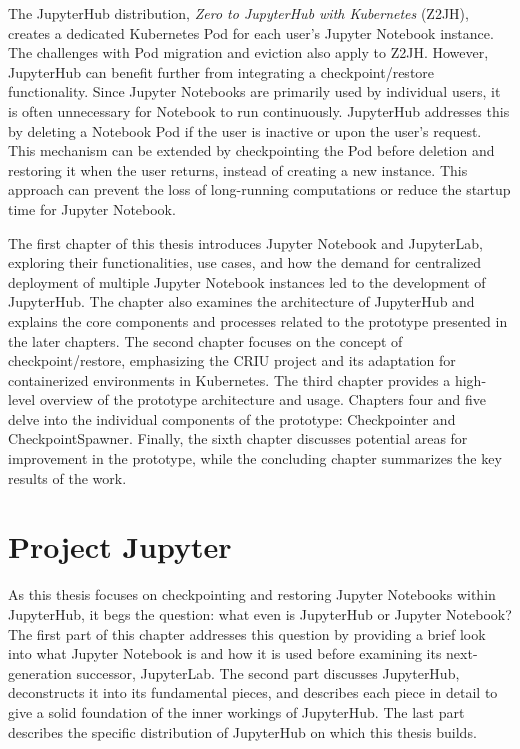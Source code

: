 \documentclass[
  digital,     %
  oneside,     %
  nosansbold,  %
  nocolorbold, %
  lof,         %
  nolot,         %
]{fithesis4}
\begin{document}
The JupyterHub distribution, \emph{Zero to JupyterHub with Kubernetes} (Z2JH), creates a dedicated Kubernetes Pod for each user's Jupyter Notebook instance. The challenges with Pod migration and eviction also apply to Z2JH. However, JupyterHub can benefit further from integrating a checkpoint/restore functionality. Since Jupyter Notebooks are primarily used by individual users, it is often unnecessary for Notebook to run continuously. JupyterHub addresses this by deleting a Notebook Pod if the user is inactive or upon the user's request. This mechanism can be extended by checkpointing the Pod before deletion and restoring it when the user returns, instead of creating a new instance. This approach can prevent the loss of long-running computations or reduce the startup time for Jupyter Notebook.

The first chapter of this thesis introduces Jupyter Notebook and JupyterLab, exploring their functionalities, use cases, and how the demand for centralized deployment of multiple Jupyter Notebook instances led to the development of JupyterHub. The chapter also examines the architecture of JupyterHub and explains the core components and processes related to the prototype presented in the later chapters. The second chapter focuses on the concept of checkpoint/restore, emphasizing the CRIU project and its adaptation for containerized environments in Kubernetes. The third chapter provides a high-level overview of the prototype architecture and usage. Chapters four and five delve into the individual components of the prototype: Checkpointer and CheckpointSpawner. Finally, the sixth chapter discusses potential areas for improvement in the prototype, while the concluding chapter summarizes the key results of the work.

\chapter{Project Jupyter}
As this thesis focuses on checkpointing and restoring Jupyter Notebooks within JupyterHub, it begs the question: what even is JupyterHub or Jupyter Notebook? The first part of this chapter addresses this question by providing a brief look into what Jupyter Notebook is and how it is used before examining its next-generation successor, JupyterLab. The second part discusses JupyterHub, deconstructs it into its fundamental pieces, and describes each piece in detail to give a solid foundation of the inner workings of JupyterHub. The last part describes the specific distribution of JupyterHub on which this thesis builds.
\end{document}
